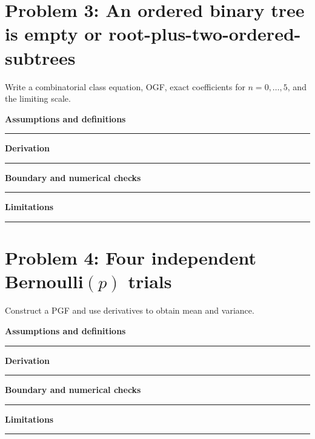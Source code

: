 \documentclass[11pt]{article}
\begin{document}
\section{Problem 3: An ordered binary tree is empty or root-plus-two-ordered-subtrees}
Write a combinatorial class equation, OGF, exact coefficients for $n=0,\ldots,5$, and the limiting scale.\par\medskip
\textbf{Assumptions and definitions}\par\vspace{0.7cm}\hrule\vspace{0.35cm}
\textbf{Derivation}\par\vspace{2.1cm}\hrule\vspace{0.3cm}
\textbf{Boundary and numerical checks}\par\vspace{1.1cm}\hrule\vspace{0.35cm}
\textbf{Limitations}\par\vspace{0.9cm}\hrule\vspace{0.35cm}
\section{\texorpdfstring{Problem 4: Four independent Bernoulli$(p)$ trials}{Problem 4: Four independent Bernoulli(p) trials}}
Construct a PGF and use derivatives to obtain mean and variance.\par\medskip
\textbf{Assumptions and definitions}\par\vspace{0.7cm}\hrule\vspace{0.35cm}
\textbf{Derivation}\par\vspace{2.1cm}\hrule\vspace{0.3cm}
\textbf{Boundary and numerical checks}\par\vspace{1.1cm}\hrule\vspace{0.35cm}
\textbf{Limitations}\par\vspace{0.9cm}\hrule\vspace{0.35cm}
\end{document}
